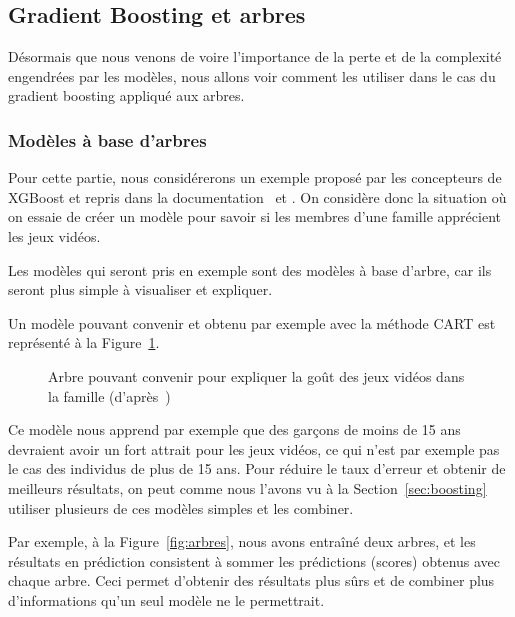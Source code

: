 \subsection{Gradient Boosting et arbres}
\label{sec:gradient-boosting}

Désormais que nous venons de voire l'importance de la perte et de la complexité engendrées par les modèles, nous allons voir comment les utiliser dans le cas du gradient boosting appliqué aux arbres.

\subsubsection{Modèles à base d'arbres}
Pour cette partie, nous considérerons un exemple proposé par les concepteurs de XGBoost et repris dans la documentation~\cite{bib:xgboost-main} et \cite{bib:xgboost-article}. On considère donc la situation où on essaie de créer un modèle pour savoir si les membres d'une famille apprécient les jeux vidéos.

Les modèles qui seront pris en exemple sont des modèles à base d'arbre, car ils seront plus simple à visualiser et expliquer.

Un modèle pouvant convenir et obtenu par exemple avec la méthode CART est représenté à la Figure~\ref{fig:arbre}.

\begin{figure}[h]
	\begin{margincap}
	  \centering
	  
	  \caption{Arbre pouvant convenir pour expliquer la goût des jeux vidéos dans la famille (d'après~\cite{bib:xgboost-article})}
	  \label{fig:arbre}
	\end{margincap}
\end{figure}

Ce modèle nous apprend par exemple que des garçons de moins de 15 ans devraient avoir un fort attrait pour les jeux vidéos, ce qui n'est par exemple pas le cas des individus de plus de 15 ans. Pour réduire le taux d'erreur et obtenir de meilleurs résultats, on peut comme nous l'avons vu à la Section~\ref{sec:boosting} utiliser plusieurs de ces modèles simples et les combiner.

Par exemple, à la Figure~\ref{fig:arbres}, nous avons entraîné deux arbres, et les résultats en prédiction consistent à sommer les prédictions (scores) obtenus avec chaque arbre. Ceci permet d'obtenir des résultats plus sûrs et de combiner plus d'informations qu'un seul modèle ne le permettrait.

